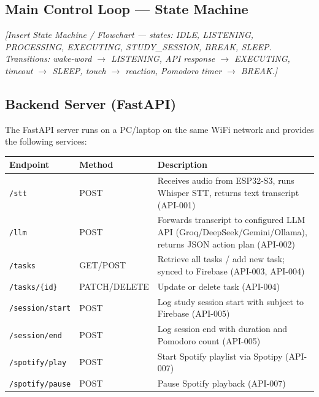 \documentclass[12pt,a4paper]{article}
\begin{document}
\subsection{Main Control Loop --- State Machine}

\vspace{0.3cm}
\begin{center}
\textit{[Insert State Machine / Flowchart --- states: IDLE,
LISTENING, PROCESSING, EXECUTING, STUDY\_SESSION, BREAK, SLEEP.
Transitions: wake-word $\rightarrow$ LISTENING, API response
$\rightarrow$ EXECUTING, timeout $\rightarrow$ SLEEP, touch
$\rightarrow$ reaction, Pomodoro timer $\rightarrow$ BREAK.]}
\end{center}
\vspace{0.3cm}
\label{fig:statemachine}

\subsection{Backend Server (FastAPI)}

The FastAPI server runs on a PC/laptop on the same WiFi network and
provides the following services:

\begin{center}
\label{tab:apiendpoints}
\scriptsize
\begin{tabular}{|L{0.25\textwidth}|L{0.12\textwidth}|L{0.50\textwidth}|}
\hline
\textbf{Endpoint} & \textbf{Method} & \textbf{Description} \\ \hline
\texttt{/stt} & POST & Receives audio from ESP32-S3, runs Whisper STT,
                        returns text transcript (API-001) \\ \hline
\texttt{/llm} & POST & Forwards transcript to configured LLM API
                        (Groq/DeepSeek/Gemini/Ollama), returns JSON
                        action plan (API-002) \\ \hline
\texttt{/tasks} & GET/POST & Retrieve all tasks / add new task; synced
                             to Firebase (API-003, API-004) \\ \hline
\texttt{/tasks/\{id\}} & PATCH/DELETE & Update or delete task
                                        (API-004) \\ \hline
\texttt{/session/start} & POST & Log study session start with subject
                                 to Firebase (API-005) \\ \hline
\texttt{/session/end} & POST & Log session end with duration and
                               Pomodoro count (API-005) \\ \hline
\texttt{/spotify/play} & POST & Start Spotify playlist via Spotipy
                                (API-007) \\ \hline
\texttt{/spotify/pause} & POST & Pause Spotify playback
                                 (API-007) \\ \hline
\end{tabular}
\end{center}
\end{document}

